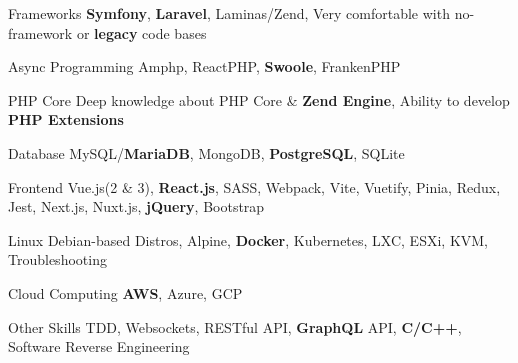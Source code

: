 
\begin{cvskills}

  \cvskill
    {Frameworks}
    {\textbf{Symfony}, \textbf{Laravel}, Laminas/Zend, Very comfortable with no-framework or \textbf{legacy} code bases}

  \cvskill
    {Async Programming}
    {Amphp, ReactPHP, \textbf{Swoole}, FrankenPHP}

  \cvskill
    {PHP Core}
    {Deep knowledge about PHP Core \& \textbf{Zend Engine}, Ability to develop \textbf{PHP Extensions}}
  
  \cvskill
    {Database}
    {MySQL/\textbf{MariaDB}, MongoDB, \textbf{PostgreSQL}, SQLite}

  \cvskill
    {Frontend} %
    {Vue.js(2 \& 3), \textbf{React.js}, SASS, Webpack, Vite, Vuetify, Pinia, Redux, Jest, Next.js, Nuxt.js, \textbf{jQuery}, Bootstrap} %

  \cvskill
    {Linux} %
    {Debian-based Distros, Alpine, \textbf{Docker}, Kubernetes, LXC, ESXi, KVM, Troubleshooting} %
    
  \cvskill
    {Cloud Computing} %
    {\textbf{AWS}, Azure, GCP} %

  \cvskill
    {Other Skills} %
    {TDD, Websockets, RESTful API, \textbf{GraphQL} API, \textbf{C/C++}, Software Reverse Engineering} %

\end{cvskills}
